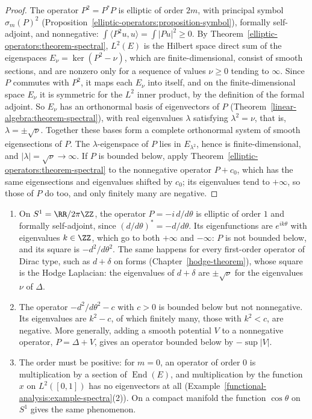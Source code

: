 \begin{proof}
The operator $P^2 = P^*P$ is elliptic of order $2m$, with principal symbol $\sigma_m(P)^2$ (Proposition~\ref{elliptic-operators:proposition-symbol}), formally self-adjoint, and nonnegative:
$\int\langle P^2u, u\rangle = \int|Pu|^2 \geq 0$. By Theorem~\ref{elliptic-operators:theorem-spectral}, $L^2(E)$ is the Hilbert space direct sum of the eigenspaces $E_\nu = \ker(P^2 - \nu)$, which are finite-dimensional,
consist of smooth sections, and are nonzero only for a sequence of values $\nu \geq 0$ tending to $\infty$. Since $P$ commutes with $P^2$, it maps each $E_\nu$ into itself, and on the finite-dimensional space $E_\nu$
it is symmetric for the $L^2$ inner product, by the definition of the formal adjoint. So $E_\nu$ has an orthonormal basis of eigenvectors of $P$ (Theorem~\ref{linear-algebra:theorem-spectral}), with real
eigenvalues $\lambda$ satisfying $\lambda^2 = \nu$, that is, $\lambda = \pm\sqrt\nu$. Together these bases form a complete orthonormal system of smooth eigensections of $P$. The $\lambda$-eigenspace of $P$ lies in
$E_{\lambda^2}$, hence is finite-dimensional, and $|\lambda| = \sqrt\nu \to \infty$. If $P$ is bounded below, apply Theorem~\ref{elliptic-operators:theorem-spectral} to the nonnegative operator $P + c_0$, which has the
same eigensections and eigenvalues shifted by $c_0$; its eigenvalues tend to $+\infty$, so those of $P$ do too, and only finitely many are negative.
\end{proof}

\begin{example}\label{elliptic-operators:example-spectral-not-positive}
\begin{enumerate}
\item On $S^1 = \RR/2\pi\ZZ$, the operator $P = -i\,d/d\theta$ is elliptic of order $1$ and formally self-adjoint, since $(d/d\theta)^* = -d/d\theta$. Its eigenfunctions are $e^{ik\theta}$ with eigenvalues $k \in \ZZ$, which go
to both $+\infty$ and $-\infty$: $P$ is not bounded below, and its square is $-d^2/d\theta^2$. The same happens for every first-order operator of Dirac type, such as $d + \delta$ on forms
(Chapter~\ref{hodge-theorem}), whose square is the Hodge Laplacian: the eigenvalues of $d + \delta$ are $\pm\sqrt\nu$ for the eigenvalues $\nu$ of $\Delta$.
\item The operator $-d^2/d\theta^2 - c$ with $c > 0$ is bounded below but not nonnegative. Its eigenvalues are $k^2 - c$, of which finitely many, those with $k^2 < c$, are negative. More generally, adding a smooth
potential $V$ to a nonnegative operator, $P = \Delta + V$, gives an operator bounded below by $-\sup|V|$.
\item The order must be positive: for $m = 0$, an operator of order $0$ is multiplication by a section of $\operatorname{End}(E)$, and multiplication by the function $x$ on $L^2([0, 1])$ has no eigenvectors at all
(Example~\ref{functional-analysis:example-spectra}(2)). On a compact manifold the function $\cos\theta$ on $S^1$ gives the same phenomenon.
\end{enumerate}
\end{example}

